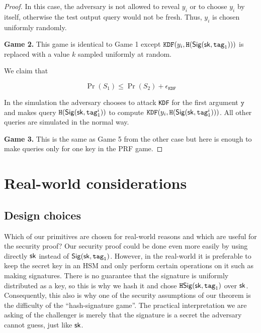 \documentclass{article}
\begin{document}
\begin{proof}
In this case, the adversary is not allowed to reveal $y_i$ or to choose $y_i$ by itself, otherwise the test output query would not be fresh. Thus, $y_i$ is chosen uniformly randomly.  


\noindent \textbf{Game 2.} This game is identical to Game 1 except $\texttt{KDF}(y_i, \texttt{H}(\mathsf{Sig} (\mathsf{sk}, \texttt{tag}_1)))$ is replaced with a value $k$ sampled uniformly at random. 

We claim that 

$$
\Pr(S_1) \le \Pr(S_2) + \epsilon_{\texttt{KDF}}
$$

In the simulation the adversary chooses to attack \texttt{KDF} for the first argument $\texttt{y}$ and makes query  $\texttt{H}(\mathsf{Sig} (\mathsf{sk}, \texttt{tag}^i_1))$ to compute $\texttt{KDF}(y_i, \texttt{H}(\mathsf{Sig} (\mathsf{sk}, \texttt{tag}^i_1)))$. All other queries are simulated in the normal way.

\noindent \textbf{Game 3.} This is the same as Game 5 from the other case but here is enough to make queries only for one key in the PRF game.
\end{proof}

\section{Real-world considerations} \label{sec:notes}

\subsection{Design choices}
Which of our primitives are chosen for real-world reasons and which are useful for the security proof? Our security proof could be done even more easily by using directly $\mathsf{sk}$ instead of $\mathsf{Sig}(\mathsf{sk}, \texttt{tag}_1)$. However, in the real-world it is preferable to keep the secret key in an HSM and only perform certain operations on it such as making signatures. There is no guarantee that the signature is uniformly distributed as a key, so this is why we hash it and chose $\texttt{H}\mathsf{Sig}(\mathsf{sk}, \texttt{tag}_1)$ over $\mathsf{sk}$. Consequently, this also is why one of the security assumptions of our theorem is the difficulty of the ``hash-signature game''. The practical interpretation we are asking of the challenger is merely that the signature is a secret the adversary cannot guess, just like $\mathsf{sk}$.
\end{document}
